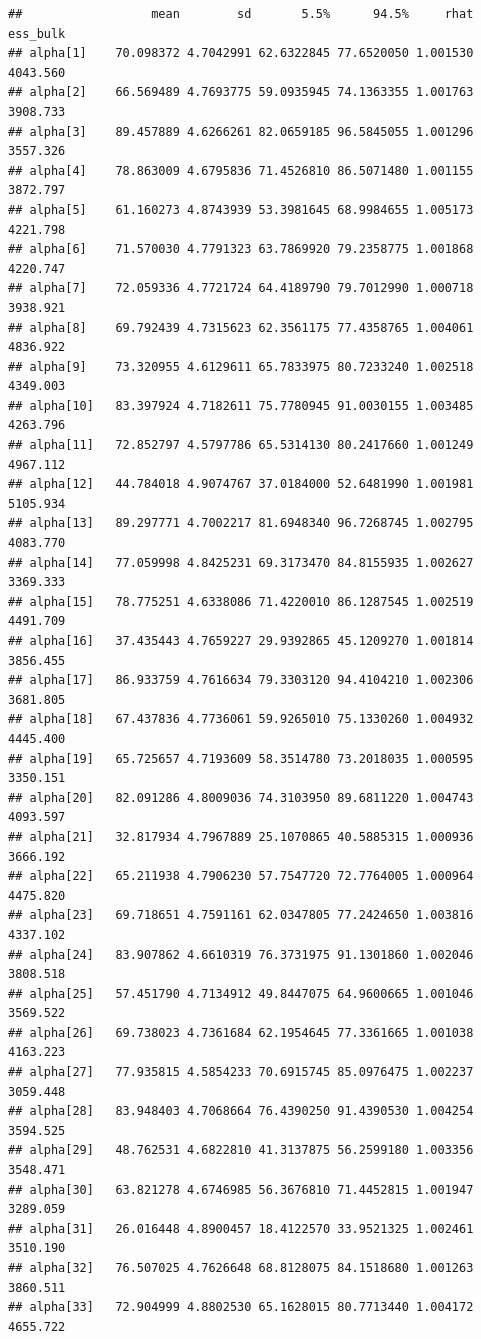 \documentclass[
]{book}
\begin{document}
\begin{verbatim}
##                  mean        sd       5.5%      94.5%     rhat ess_bulk
## alpha[1]    70.098372 4.7042991 62.6322845 77.6520050 1.001530 4043.560
## alpha[2]    66.569489 4.7693775 59.0935945 74.1363355 1.001763 3908.733
## alpha[3]    89.457889 4.6266261 82.0659185 96.5845055 1.001296 3557.326
## alpha[4]    78.863009 4.6795836 71.4526810 86.5071480 1.001155 3872.797
## alpha[5]    61.160273 4.8743939 53.3981645 68.9984655 1.005173 4221.798
## alpha[6]    71.570030 4.7791323 63.7869920 79.2358775 1.001868 4220.747
## alpha[7]    72.059336 4.7721724 64.4189790 79.7012990 1.000718 3938.921
## alpha[8]    69.792439 4.7315623 62.3561175 77.4358765 1.004061 4836.922
## alpha[9]    73.320955 4.6129611 65.7833975 80.7233240 1.002518 4349.003
## alpha[10]   83.397924 4.7182611 75.7780945 91.0030155 1.003485 4263.796
## alpha[11]   72.852797 4.5797786 65.5314130 80.2417660 1.001249 4967.112
## alpha[12]   44.784018 4.9074767 37.0184000 52.6481990 1.001981 5105.934
## alpha[13]   89.297771 4.7002217 81.6948340 96.7268745 1.002795 4083.770
## alpha[14]   77.059998 4.8425231 69.3173470 84.8155935 1.002627 3369.333
## alpha[15]   78.775251 4.6338086 71.4220010 86.1287545 1.002519 4491.709
## alpha[16]   37.435443 4.7659227 29.9392865 45.1209270 1.001814 3856.455
## alpha[17]   86.933759 4.7616634 79.3303120 94.4104210 1.002306 3681.805
## alpha[18]   67.437836 4.7736061 59.9265010 75.1330260 1.004932 4445.400
## alpha[19]   65.725657 4.7193609 58.3514780 73.2018035 1.000595 3350.151
## alpha[20]   82.091286 4.8009036 74.3103950 89.6811220 1.004743 4093.597
## alpha[21]   32.817934 4.7967889 25.1070865 40.5885315 1.000936 3666.192
## alpha[22]   65.211938 4.7906230 57.7547720 72.7764005 1.000964 4475.820
## alpha[23]   69.718651 4.7591161 62.0347805 77.2424650 1.003816 4337.102
## alpha[24]   83.907862 4.6610319 76.3731975 91.1301860 1.002046 3808.518
## alpha[25]   57.451790 4.7134912 49.8447075 64.9600665 1.001046 3569.522
## alpha[26]   69.738023 4.7361684 62.1954645 77.3361665 1.001038 4163.223
## alpha[27]   77.935815 4.5854233 70.6915745 85.0976475 1.002237 3059.448
## alpha[28]   83.948403 4.7068664 76.4390250 91.4390530 1.004254 3594.525
## alpha[29]   48.762531 4.6822810 41.3137875 56.2599180 1.003356 3548.471
## alpha[30]   63.821278 4.6746985 56.3676810 71.4452815 1.001947 3289.059
## alpha[31]   26.016448 4.8900457 18.4122570 33.9521325 1.002461 3510.190
## alpha[32]   76.507025 4.7626648 68.8128075 84.1518680 1.001263 3860.511
## alpha[33]   72.904999 4.8802530 65.1628015 80.7713440 1.004172 4655.722

\end{verbatim}
\end{document}
